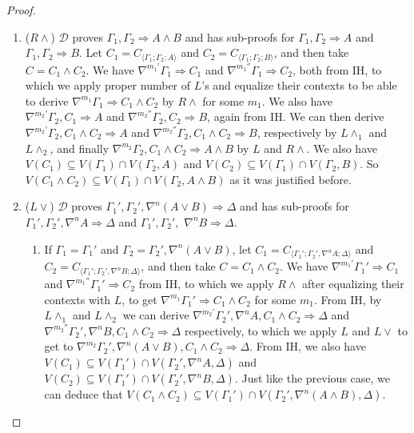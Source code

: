 \documentclass[12pt,a4paper]{article}
\theoremstyle{plain}
\theoremstyle{definition}
\begin{document}
\begin{proof}
\begin{enumerate}
		\item ($R\land$) $\mathcal{D}$ proves $\Gamma_1 , \Gamma_2 \Rightarrow A \land B$ and has sub-proofs for $\Gamma_1 , \Gamma_2 \Rightarrow A$ and $\Gamma_1 , \Gamma_2 \Rightarrow B$.
		Let $C_1 = C_{\langle\Gamma_1;\Gamma_2;A\rangle}$ and $C_2 = C_{\langle\Gamma_1;\Gamma_2;B\rangle}$, and then take $C = C_1 \land C_2$.
		We have $\nabla^{m_1'} \Gamma_1 \Rightarrow C_1$ and $\nabla^{m_1''} \Gamma_1 \Rightarrow C_2$, both from IH, to which we apply proper number of $L$'s and equalize their contexts to be able to derive $\nabla^{m_1} \Gamma_1 \Rightarrow C_1 \wedge C_2$ by $R\wedge$ for some $m_1$.
		We also have $\nabla^{m_2'} \Gamma_2 , C_1 \Rightarrow A$ and $\nabla^{m_2''} \Gamma_2 , C_2 \Rightarrow B$, again from IH.
		We can then derive $\nabla^{m_2'} \Gamma_2 , C_1 \land C_2 \Rightarrow A$ and $\nabla^{m_2''} \Gamma_2 , C_1 \land C_2 \Rightarrow B$, respectively by $L\land_1$ and $L\land_2$, and finally  $\nabla^{m_2} \Gamma_2 , C_1 \land C_2 \Rightarrow A \land B$ by $L$ and $R\land$.
		We also have $V(C_1) \subseteq V(\Gamma_1) \cap V(\Gamma_2 , A)$ and $V(C_2) \subseteq V(\Gamma_1) \cap V(\Gamma_2 , B)$. So $V(C_1 \land C_2) \subseteq V(\Gamma_1) \cap V(\Gamma_2 , A \land B)$ as it was justified before.

		\item ($L\lor$) $\mathcal{D}$ proves $\Gamma_1' , \Gamma_2' , \nabla^n (A \lor B) \Rightarrow \Delta$ and has sub-proofs for $\Gamma_1' , \Gamma_2' , \nabla^n A \Rightarrow \Delta$ and $\Gamma_1' , \Gamma_2' ,$ $\nabla^n B \Rightarrow \Delta$.
		\begin{enumerate}
			\item If $\Gamma_1 = \Gamma_1'$ and $\Gamma_2 = \Gamma_2' , \nabla^n (A \lor B)$, let $C_1 = C_{\langle\Gamma_1';\Gamma_2',\nabla^n A;\Delta\rangle}$ and $C_2 = C_{\langle\Gamma_1';\Gamma_2',\nabla^n B;\Delta\rangle}$, and then take $C = C_1 \land C_2$.
			We have $\nabla^{m_1'} \Gamma_1' \Rightarrow C_1$ and $\nabla^{m_1''} \Gamma_1' \Rightarrow C_2$ from IH, to which we apply $R\land$ after equalizing their contexts with $L$, to get $\nabla^{m_1} \Gamma_1' \Rightarrow C_1 \land C_2$ for some $m_1$.
			From IH, by $L\land_1$ and $L\land_2$ we can derive $\nabla^{m_2'}\Gamma_2' , \nabla^n A , C_1 \land C_2 \Rightarrow \Delta$ and $\nabla^{m_2''} \Gamma_2' , \nabla^n B , C_1 \land C_2 \Rightarrow \Delta$ respectively, to which we apply $L$ and $L\lor$ to get to $\nabla^{m_2} \Gamma_2' , \nabla^n (A \lor B) , C_1 \land C_2 \Rightarrow \Delta$.
			From IH, we also have $V(C_1) \subseteq V(\Gamma_1') \cap V(\Gamma_2' , \nabla^n A , \Delta)$ and $V(C_2) \subseteq V(\Gamma_1') \cap V(\Gamma_2' , \nabla^n B , \Delta)$. Just like the previous case, we can deduce that $V(C_1 \land C_2) \subseteq V(\Gamma_1') \cap V(\Gamma_2' , \nabla^n (A \land B) , \Delta)$.


\end{enumerate}
\end{enumerate}
\end{proof}
\end{document}
